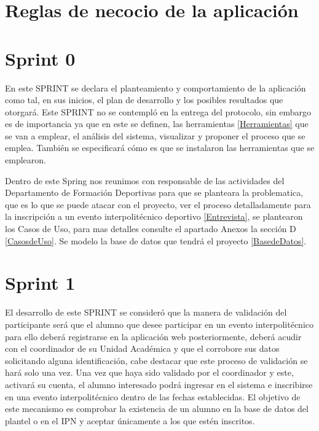 	
	\section{Reglas de necocio de la aplicación}
	
	\section{Sprint 0}
	\noindent En este SPRINT se declara el planteamiento y comportamiento de la aplicación como tal, en sus inicios, el plan de desarrollo y los posibles resultados que otorgará.
	Este SPRINT no se contempló en la entrega del protocolo, sin embargo es de importancia ya que en este se definen, las herramientas \ref{Herramientas} que se van a emplear, el análisis del sistema, visualizar y proponer el proceso que se emplea.
	También se especificará cómo es que se instalaron las herramientas que se emplearon.
	
	\noindent Dentro de este Spring nos reunimos con responsable de las actividades del Departamento de Formación Deportivas para que se planteara la problematica, que es lo que se puede atacar con el proyecto, ver el proceso detalladamente para la inscripción a un evento interpolitécnico deportivo \ref{Entrevista}, se plantearon los Casos de Uso, para mas detalles consulte el apartado Anexos la sección D \ref{CasosdeUso}. Se modelo la base de datos que tendrá el proyecto \ref{BasedeDatos}. 
	\pagebreak
	
	\section{Sprint 1}
	\noindent El desarrollo de este SPRINT se consideró que la manera de validación del participante será que el alumno que desee participar en un evento interpolitécnico para ello deberá registrarse en la aplicación web posteriormente, deberá acudir con el coordinador de su Unidad Académica y que el corrobore sus datos solicitando alguna identificación, cabe destacar que este proceso de validación se hará solo una vez.
	Una vez que haya sido validado por el coordinador y este, activará su cuenta, el alumno interesado podrá ingresar en el sistema e inscribirse en una evento interpolitécnico dentro de las fechas establecidas.
	El objetivo de este mecanismo es comprobar la existencia de un alumno en la base de datos del plantel o en el IPN y aceptar únicamente a los que estén inscritos.
	
